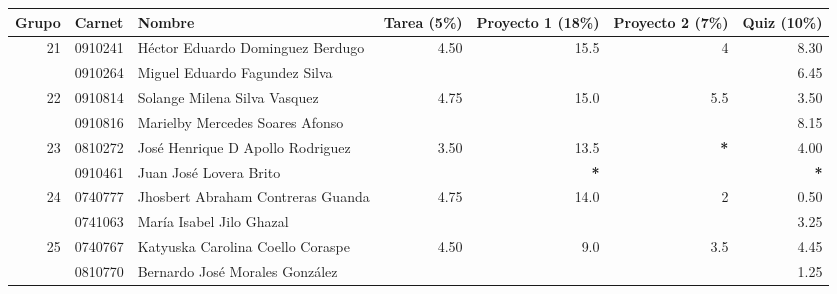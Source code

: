 \documentclass[]{article}
\begin{document}
        \newcommand{\NoE}{\textbf{*}}
        \newcommand{\NoN}{\textbf{—}}

        \begin{table}[h!]
        \begin{center}
        \begin{tabular}{ | r | l | l | r | r | r | r | }
                \hline
                Grupo & Carnet & Nombre & Tarea (5\%) & Proyecto 1 (18\%) & Proyecto 2 (7\%) & Quiz (10\%) \\

                \hline \multirow{2}{*}{21}
                & 0910241 & Héctor Eduardo Dominguez Berdugo  & \multirow{2}{*}{4.50} & \multirow{2}{*}{15.5} & \multirow{2}{*}{ 4  } & 8.30 \\
                & 0910264 & Miguel Eduardo Fagundez Silva     &                       &                       &                       & 6.45 \\

                \hline \multirow{2}{*}{22}
                & 0910814 & Solange Milena Silva Vasquez      & \multirow{2}{*}{4.75} & \multirow{2}{*}{15.0} & \multirow{2}{*}{ 5.5} & 3.50 \\
                & 0910816 & Marielby Mercedes Soares Afonso   &                       &                       &                       & 8.15 \\

                \hline \multirow{2}{*}{23}
                & 0810272 & José Henrique D Apollo Rodriguez  & \multirow{2}{*}{3.50} & \multirow{1}{*}{13.5} & \multirow{2}{*}{\NoE} & 4.00 \\
                & 0910461 & Juan José Lovera Brito            &                       & \multirow{1}{*}{\NoE} &                       & \NoE \\

                \hline \multirow{2}{*}{24}
                & 0740777 & Jhosbert Abraham Contreras Guanda & \multirow{2}{*}{4.75} & \multirow{2}{*}{14.0} & \multirow{2}{*}{ 2  } & 0.50 \\
                & 0741063 & María Isabel Jilo Ghazal          &                       &                       &                       & 3.25 \\

                \hline \multirow{2}{*}{25}
                & 0740767 & Katyuska Carolina Coello Coraspe  & \multirow{2}{*}{4.50} & \multirow{2}{*}{ 9.0} & \multirow{2}{*}{ 3.5} & 4.45 \\
                & 0810770 & Bernardo José Morales González    &                       &                       &                       & 1.25 \\


\end{tabular}
\end{center}
\end{table}
\end{document}
